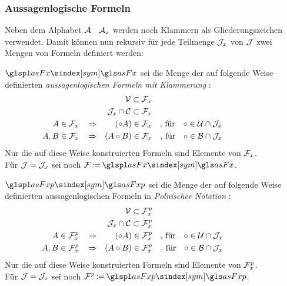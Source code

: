 \subsubsection{Aussagenlogische Formeln}%
\label{subsub:Formeln}

Neben dem Alphabet $\mathcal{A}$ \textbzw\ $\mathcal{A}_x$ werden noch Klammern als Gliederungszeichen verwendet.
Damit können nun rekursiv für jede Teilmenge $\mathcal{J}_x$ von $\mathcal{J}$ zwei Mengen von Formeln definiert werden:

$\glsSym{asFx}$ sei die Menge der auf folgende Weise definierten \emph{aussagenlogischen Formeln mit Klammerung}%
:
\begin{align}
	&                               & \mathcal{V}            \subset \mathcal{F}_x
	\\
	&                               & \mathcal{J}_x \cap \mathcal{C} \subset \mathcal{F}_x
	\\
	A    \in \mathcal{F}_x & \quad \operatorname{\Rightarrow} &  (\circ A)          \in \mathcal{F}_x
	& & \text{, für} \quad \circ \in \mathcal{U} \cap \mathcal{J}_x
	\\
	A, B \in \mathcal{F}_x & \quad \operatorname{\Rightarrow} & (A \circ B)         \in \mathcal{F}_x
	& & \text{, für} \quad \circ \in \mathcal{B} \cap \mathcal{J}_x
	&&&&&&&&&&
\end{align}
Nur die auf diese Weise konstruierten Formeln sind Elemente von $\mathcal{F}_x$.
\\Für $\mathcal{J} = \mathcal{J}_x$ sei noch $\asF \defeq \glsSym{asFx}$.

$\glsSym{asFxp}$ sei die Menge der auf folgende Weise definierten aussagenlogischen Formeln in \emph{Polnischer Notation}%
:
\begin{align}
	&                                & \mathcal{V}            \subset \mathcal{F}_x^p
	\\
	&                                & \mathcal{J}_x \cap \mathcal{C} \subset \mathcal{F}_x^p
	\\
	A    \in \mathcal{F}_x^p & \quad \operatorname{\Rightarrow} &  (\circ A)          \in \mathcal{F}_x^p
	& & \text{, für}  \quad \circ \in \mathcal{U} \cap \mathcal{J}_x
	\\
	A, B \in \mathcal{F}_x^p & \quad \operatorname{\Rightarrow} & (A \circ B)         \in \mathcal{F}_x^p
	& & \text{, für}  \quad \circ \in \mathcal{B} \cap \mathcal{J}_x
	&&&&&&&&&&
\end{align}
Nur die auf diese Weise konstruierten Formeln sind Elemente von $\mathcal{F}_x^p$.
\\Für $\mathcal{J} = \mathcal{J}_x$ sei noch $\asFp \defeq \glsSym{asFxp}$.

